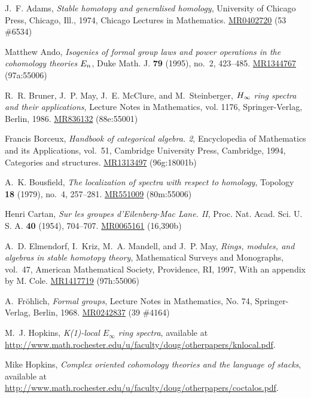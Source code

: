 \documentclass{gtpart}
\theoremstyle{definition}
\theoremstyle{remark}
\begin{document}
\newcommand{\MRn}[2]{\href{http://www.ams.org/mathscinet-getitem?mr=#1}{MR#1} #2}
\begin{thebibliography}

J.~F. Adams, \emph{Stable homotopy and generalised homology}, University of
  Chicago Press, Chicago, Ill., 1974, Chicago Lectures in Mathematics.
  \MRn{0402720}{(53 \#6534)}

Matthew Ando, \emph{Isogenies of formal group laws and power operations in the
  cohomology theories {$E\sb n$}}, Duke Math. J. \textbf{79} (1995), no.~2,
  423--485. \href{http://www.ams.org/mathscinet-getitem?mr=1344767}{MR1344767} (97a:55006)

R.~R. Bruner, J.~P. May, J.~E. McClure, and M.~Steinberger, \emph{{$H\sb \infty
  $} ring spectra and their applications}, Lecture Notes in Mathematics, vol.
  1176, Springer-Verlag, Berlin, 1986. \href{http://www.ams.org/mathscinet-getitem?mr=836132}{MR836132} (88e:55001)

Francis Borceux, \emph{Handbook of categorical algebra. 2}, Encyclopedia of
  Mathematics and its Applications, vol.~51, Cambridge University Press,
  Cambridge, 1994, Categories and structures. \MRn{1313497}{(96g:18001b)}

A.~K. Bousfield, \emph{The localization of spectra with respect to homology},
  Topology \textbf{18} (1979), no.~4, 257--281. \MRn{551009}{(80m:55006)}

Henri Cartan, \emph{Sur les groupes d'{E}ilenberg-{M}ac {L}ane. {II}}, Proc.
  Nat. Acad. Sci. U. S. A. \textbf{40} (1954), 704--707. \MRn{0065161}{(16,390b)}

A.~D. Elmendorf, I.~Kriz, M.~A. Mandell, and J.~P. May, \emph{Rings, modules,
  and algebras in stable homotopy theory}, Mathematical Surveys and Monographs,
  vol.~47, American Mathematical Society, Providence, RI, 1997, With an
  appendix by M. Cole. \MRn{1417719}{(97h:55006)}

A.~Fr{\"o}hlich, \emph{Formal groups}, Lecture Notes in Mathematics, No. 74,
  Springer-Verlag, Berlin, 1968. \MRn{0242837}{(39 \#4164)}

M.~J. Hopkins, \emph{K(1)-local ${E}_\infty$ ring spectra}, available at
  \url{http://www.math.rochester.edu/u/faculty/doug/otherpapers/knlocal.pdf}.

Mike Hopkins, \emph{Complex oriented cohomology theories and the language of
  stacks}, available at
  \url{http://www.math.rochester.edu/u/faculty/doug/otherpapers/coctalos.pdf}.


\end{thebibliography}
\end{document}
